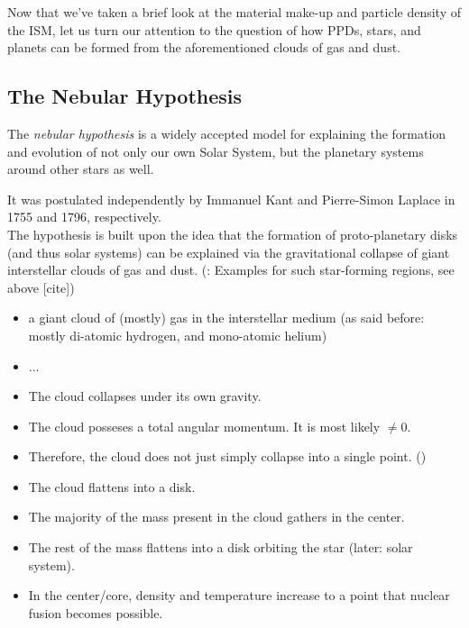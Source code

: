         Now that we've taken a brief look at the material make-up and particle density of the ISM, 
        let us turn our attention to the question of how PPDs, stars, and planets can be formed 
        from the aforementioned clouds of gas and dust.

    \subsection{The Nebular Hypothesis}

        The \textit{nebular hypothesis} is a widely accepted model for explaining the formation and 
        evolution of not only our own Solar System, but the planetary systems around other stars as 
        well. 

        It was postulated independently by Immanuel Kant        %
        and Pierre-Simon Laplace                                %
        in 1755 and 1796, respectively. \\                      %

        The hypothesis is built upon the idea that the formation of proto-planetary disks (and thus 
        solar systems) can be explained via the gravitational collapse of giant interstellar clouds 
        of gas and dust. (\todo: Examples for such star-forming regions, see above [cite]) \\

        \begin{itemize}
            \item a giant cloud of (mostly) gas in the interstellar medium 
                  (as said before: mostly di-atomic hydrogen, and mono-atomic helium)
        \end{itemize}
        \begin{itemize}
            \item ...
        \end{itemize}
        \begin{itemize}
            \item The cloud collapses under its own gravity. 
            \item The cloud posseses a total angular momentum. It is most likely $\neq 0$.
            \item Therefore, the cloud does not just simply collapse into a single point. 
                  ()
            \item The cloud flattens into a disk.
            \item The majority of the mass present in the cloud gathers in the center.
            \item The rest of the mass flattens into a disk orbiting the star 
                  (later: solar system).
            \item In the center/core, density and temperature increase to a point that nuclear 
                  fusion becomes possible.
        \end{itemize}

